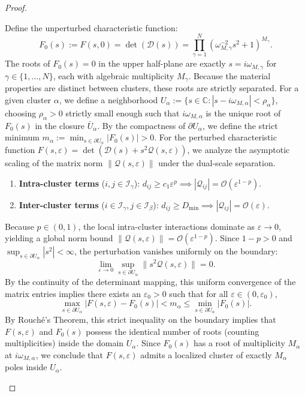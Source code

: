 \documentclass[11pt,a4paper]{article}
\numberwithin{equation}{section}
\begin{document}
\begin{proof}
\begin{enumerate}
\noindent
Define the unperturbed characteristic function:
\[
    F_0(s) := F(s, 0) = \det(\mathcal{D}(s)) = \prod_{\gamma=1}^N \left(\omega_{M,\gamma}^{-2} s^2 + 1\right)^{M_\gamma}.
\]
The roots of $F_0(s) = 0$ in the upper half-plane are exactly $s = i\omega_{M,\gamma}$ for $\gamma \in \{1, \dots, N\}$, each with algebraic multiplicity $M_\gamma$. Because the material properties are distinct between clusters, these roots are strictly separated. For a given cluster $\alpha$, we define a neighborhood $U_\alpha := \{s \in \mathbb{C} : |s - i\omega_{M,\alpha}| < \rho_\alpha\}$, choosing $\rho_\alpha > 0$ strictly small enough such that $i\omega_{M,\alpha}$ is the unique root of $F_0(s)$ in the closure $\bar{U}_\alpha$.
\newline
By the compactness of $\partial U_\alpha$, we define the strict minimum $m_\alpha := \min_{s \in \partial U_\alpha} |F_0(s)| > 0$. For the perturbed characteristic function $F(s, \varepsilon) = \det(\mathcal{D}(s) + s^2 \mathcal{Q}(s, \varepsilon))$, we analyze the asymptotic scaling of the matrix norm $\|\mathcal{Q}(s, \varepsilon)\|$ under the dual-scale separation. 
\begin{enumerate}
    \item \textbf{Intra-cluster terms} ($i,j \in \mathcal{I}_\gamma$): $d_{ij} \ge c_1 \varepsilon^p \implies |\mathcal{Q}_{ij}| = \mathcal{O}(\varepsilon^{1-p})$.
    \item \textbf{Inter-cluster terms} ($i \in \mathcal{I}_\gamma, j \in \mathcal{I}_\beta$): $d_{ij} \ge D_{\min} \implies |\mathcal{Q}_{ij}| = \mathcal{O}(\varepsilon)$.
\end{enumerate}
Because $p \in (0,1)$, the local intra-cluster interactions dominate as $\varepsilon \to 0$, yielding a global norm bound $\|\mathcal{Q}(s, \varepsilon)\| = \mathcal{O}(\varepsilon^{1-p})$. Since $1-p > 0$ and $\sup_{s \in \partial U_\alpha}|s^2| < \infty$, the perturbation vanishes uniformly on the boundary: 
\[
    \lim_{\varepsilon \to 0} \sup_{s \in \partial U_\alpha} \|s^2 \mathcal{Q}(s, \varepsilon)\| = 0.
\]
By the continuity of the determinant mapping, this uniform convergence of the matrix entries implies there exists an $\varepsilon_0 > 0$ such that for all $\varepsilon \in (0, \varepsilon_0)$,
\[
    \max_{s \in \partial U_\alpha} |F(s, \varepsilon) - F_0(s)| < m_\alpha \le \min_{s \in \partial U_\alpha} |F_0(s)|.
\]
By Rouché's Theorem, this strict inequality on the boundary implies that $F(s, \varepsilon)$ and $F_0(s)$ possess the identical number of roots (counting multiplicities) inside the domain $U_\alpha$. Since $F_0(s)$ has a root of multiplicity $M_\alpha$ at $i\omega_{M,\alpha}$, we conclude that $F(s, \varepsilon)$ admits a localized cluster of exactly $M_\alpha$ poles inside $U_\alpha$.
\end{enumerate}



\end{proof}
\end{document}
